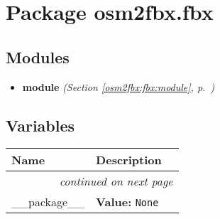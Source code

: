 %
%
%


\section{Package osm2fbx.fbx}

    \label{osm2fbx:fbx}


\subsection{Modules}

\begin{itemize}
\setlength{\parskip}{0ex}
\item \textbf{module}
  \textit{(Section \ref{osm2fbx:fbx:module}, p.~\pageref{osm2fbx:fbx:module})}

\end{itemize}



  \subsection{Variables}

    \vspace{-1cm}
\hspace{\varindent}\begin{longtable}{|p{\varnamewidth}|p{\vardescrwidth}|l}
\cline{1-2}
\cline{1-2} \centering \textbf{Name} & \centering \textbf{Description}& \\
\cline{1-2}
\endhead\cline{1-2}\multicolumn{3}{r}{\small\textit{continued on next page}}\\\endfoot\cline{1-2}
\endlastfoot\raggedright \_\-\_\-p\-a\-c\-k\-a\-g\-e\-\_\-\_\- & \raggedright \textbf{Value:} 
{\tt None}&\\
\cline{1-2}
\end{longtable}

